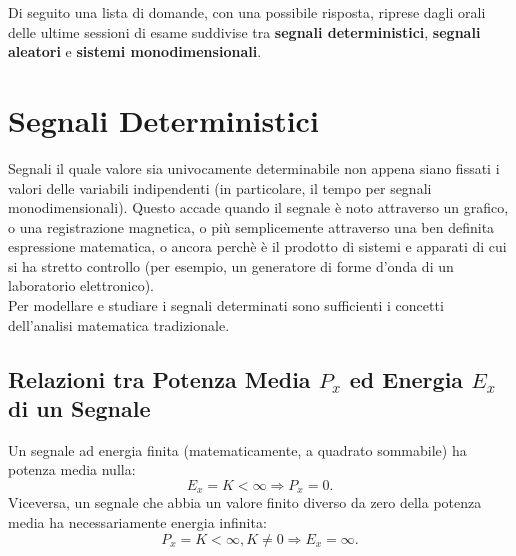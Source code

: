 \documentclass[12pt,oneside,openany]{memoir}
\numberwithin{equation}{subsection}
\begin{document}
Di seguito una lista di domande, con una possibile risposta, riprese dagli orali
delle ultime sessioni di esame suddivise tra \textbf{segnali deterministici},
\textbf{segnali aleatori} e \textbf{sistemi monodimensionali}.


\section{Segnali Deterministici}
Segnali il quale valore sia univocamente determinabile non appena siano fissati
i valori delle variabili indipendenti (in particolare, il tempo per segnali
monodimensionali). Questo accade quando il segnale \`e noto attraverso un
grafico, o una registrazione magnetica, o pi\`u semplicemente attraverso una ben
definita espressione matematica, o ancora perch\`e \`e il prodotto di sistemi e
apparati di cui si ha stretto controllo (per esempio, un generatore di forme
d'onda di un laboratorio elettronico).\\
Per modellare e studiare i segnali determinati sono sufficienti i concetti
dell'analisi matematica tradizionale.


\newpage
\subsection{Relazioni tra Potenza Media \textit{$P_x$} ed Energia \textit{$E_x$}
di un Segnale}
Un segnale ad energia finita (matematicamente, a quadrato sommabile) ha potenza
media nulla:
\begin{equation}
	E_x = K < \infty \Longrightarrow P_x = 0.
\end{equation}
Viceversa, un segnale che abbia un valore finito diverso da zero della potenza
media ha necessariamente energia infinita:
\begin{equation}
	P_x = K < \infty, K \neq 0 \Longrightarrow E_x = \infty.
\end{equation}
\end{document}
